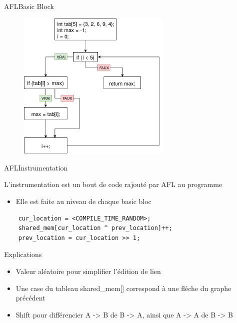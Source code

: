 \begin{frame}{AFL}{Basic Block}
  \begin{figure}
    \includegraphics[width=0.65\textwidth]{../medias/BB.png}
  \end{figure}
\end{frame}

\begin{frame}[fragile]{AFL}{Instrumentation}
  {\Large \centerline{L'instrumentation est un bout de code rajouté par AFL au programme}}
  \begin{itemize}
    \item{Elle est faite au niveau de chaque basic bloc} \pause
  \end{itemize}

  \hspace{0.5cm}

  \begin{lstlisting}
    cur_location = <COMPILE_TIME_RANDOM>;
    shared_mem[cur_location ^ prev_location]++;
    prev_location = cur_location >> 1;
  \end{lstlisting}

  \pause
  \hspace{3.5cm}

  \begin{exampleblock}{Explications}
    \begin{itemize}
      \item{Valeur aléatoire pour simplifier l'édition de lien} \pause
      \item{Une case du tableau shared\_mem[] correspond à une flèche du graphe précédent} \pause
      \item{Shift pour différencier A -> B de B -> A, ainsi que A -> A de B -> B}
    \end{itemize}
  \end{exampleblock}
\end{frame}

